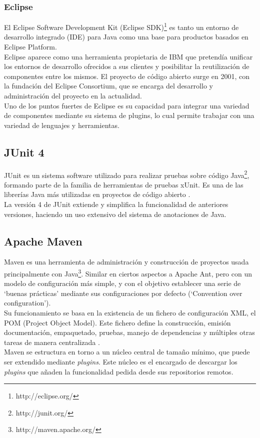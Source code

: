 \subsubsection{Eclipse}
El Eclipse Software Development Kit (Eclipse SDK)\footnote{http://eclipse.org/} es tanto un entorno de desarrollo integrado (IDE) para Java como una base para productos basados en Eclipse Platform.
\\
Eclipse aparece como una herramienta propietaria de IBM que pretendía unificar los entornos de desarrollo ofrecidos a sus clientes y posibilitar la reutilización de componentes entre los mismos.
El proyecto de código abierto surge en 2001, con la fundación del Eclipse Consortium, que se encarga del desarrollo y administración del proyecto en la actualidad. \cite{website:eclipseFAQ}
\\
Uno de los puntos fuertes de Eclipse es su capacidad para integrar una variedad de componentes mediante su sistema de plugins, lo cual permite trabajar con una variedad de lenguajes y herramientas.

\subsection{JUnit 4}
JUnit es un sistema software utilizado para realizar pruebas sobre código Java\footnote{http://junit.org/}, formando parte de la familia de herramientas de pruebas xUnit.
Es una de las librerías Java más utilizadas en proyectos de código abierto \cite{website:githubTOP}.
\\
La versión 4 de JUnit extiende y simplifica la funcionalidad de anteriores versiones, haciendo un uso extensivo del sistema de anotaciones de Java.

\subsection{Apache Maven}
Maven es una herramienta de administración y construcción de proyectos usada principalmente con Java\footnote{http://maven.apache.org/}.
Similar en ciertos aspectos a Apache Ant, pero con un modelo de configuración más simple, y con el objetivo establecer una serie de `buenas prácticas' mediante sus configuraciones por defecto (`Convention over configuration').
\\
Su funcionamiento se basa en la existencia de un fichero de configuración XML, el POM (Project Object Model).
Este fichero define la construcción, emisión documentación, empaquetado, pruebas, manejo de dependencias y múltiples otras tareas de manera centralizada \cite{mvnEx}.
\\
Maven se estructura en torno a un núcleo central de tamaño mínimo, que puede ser extendido mediante \emph{plugins}.
Este núcleo es el encargado de descargar los \emph{plugins} que añaden la funcionalidad pedida desde sus repositorios remotos.

